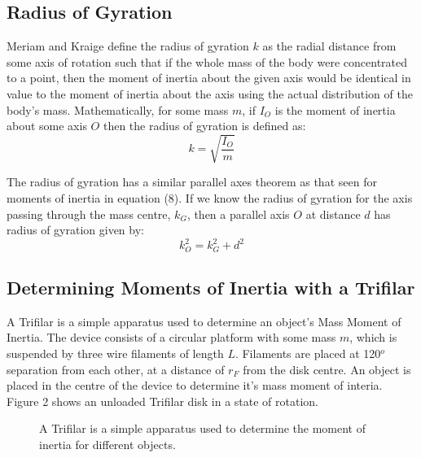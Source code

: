 \documentclass[a4paper]{article}
\begin{document}
\subsection{Radius of Gyration}
Meriam and Kraige \cite{Meriam:2000} define the radius of gyration $k$ as the radial distance from some axis of rotation such that if the whole mass of the body were concentrated to a point, then the moment of inertia about the given axis would be identical in value to the moment of inertia about the axis using the actual distribution of the body's mass. Mathematically, for some mass $m$, if $I_O$ is the moment of inertia about some axis $O$ then the radius of gyration is defined as:
\begin{equation}
k = \sqrt{\frac{I_O}{m}}
\end{equation}

The radius of gyration has a similar parallel axes theorem as that seen for moments of inertia in equation (8). If we know the radius of gyration for the axis passing through the mass centre, $k_G$, then a parallel axis $O$ at distance $d$ has radius of gyration given by:
\begin{equation}
	k^2_O = k^2_G + d^2
\end{equation}

\subsection{Determining Moments of Inertia with a Trifilar}
A Trifilar is a simple apparatus used to determine an object's Mass Moment of Inertia. The device consists of a circular platform with some mass $m$, which is suspended by three wire filaments of length $L$. Filaments are placed at 120$^o$ separation from each other, at a distance of $r_F$ from the disk centre. An object is placed in the centre of the device to determine it's mass moment of interia. Figure 2 shows an unloaded Trifilar disk in a state of rotation.

\begin{figure}[h]
	\centering
	\caption{A Trifilar is a simple apparatus used to determine the moment of inertia for different objects.}
\end{figure}
\end{document}
